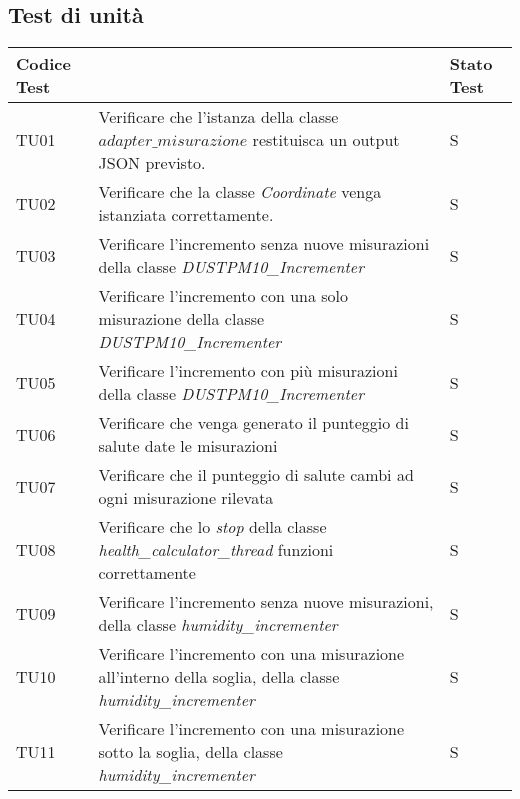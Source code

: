 \subsection{Test di unità}

\begin{longtable}{|C{1.9cm}|L{7cm}|C{2cm}|}
    \hline
    \textbf{Codice Test} &  & \textbf{Stato Test} \\
    \hline \hline
    
    TU01 & Verificare che l'istanza della classe $\textit{adapter\_misurazione}$ restituisca un output JSON previsto.  & S \\
    \hline

    TU02 & Verificare che la classe \textit{Coordinate} venga istanziata correttamente.  & S \\
    \hline

    TU03 & Verificare l'incremento senza nuove misurazioni della classe \textit{DUSTPM10\_Incrementer} & S \\
    \hline

    TU04 & Verificare l'incremento con una solo misurazione della classe \textit{DUSTPM10\_Incrementer} & S \\
    \hline

    TU05 & Verificare l'incremento con più misurazioni della classe  \textit{DUSTPM10\_Incrementer} & S \\
    \hline

    TU06 & Verificare che venga generato il punteggio di salute date le misurazioni & S \\
    \hline

    TU07 & Verificare che il punteggio di salute cambi ad ogni misurazione rilevata & S \\
    \hline

    TU08 & Verificare che lo \textit{stop} della classe \textit{health\_calculator\_thread} funzioni correttamente & S \\
    \hline

    TU09 & Verificare l'incremento senza nuove misurazioni, della classe \textit{humidity\_incrementer} & S \\
    \hline

    TU10 & Verificare l'incremento con una misurazione all'interno della soglia, della classe \textit{humidity\_incrementer} & S \\
    \hline

    TU11 & Verificare l'incremento con una misurazione sotto la soglia,  della classe \textit{humidity\_incrementer} & S \\
    \hline


\end{longtable}
